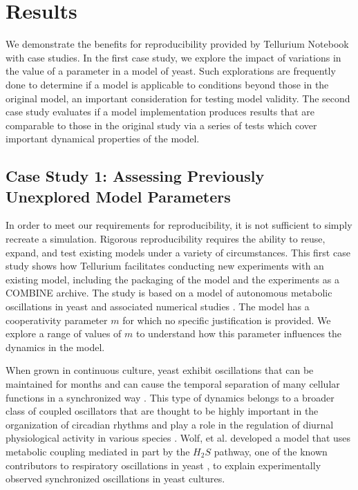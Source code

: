 \documentclass[10pt,letterpaper]{article}
\begin{document}

\section*{Results}

We demonstrate the benefits for reproducibility provided by Tellurium Notebook with case studies. In the first case study, we explore the impact of variations in the value of a parameter in a model of yeast. Such explorations are frequently done to determine if a model is applicable to conditions beyond those in the original model, an important consideration for testing model validity. The second case study evaluates if a model implementation produces results that are comparable to those in the original study via a series of tests which cover important dynamical properties of the model.

\subsection*{Case Study 1: Assessing Previously Unexplored Model Parameters}

In order to meet our requirements for reproducibility, it is not sufficient to simply recreate a simulation. Rigorous reproducibility requires the ability to reuse, expand, and test existing models under a variety of circumstances. This first case study shows how Tellurium facilitates conducting new experiments with an existing model, including the packaging of the model and the experiments as a COMBINE archive. The study is based on a model of autonomous metabolic oscillations in yeast and associated numerical studies \cite{wolf2001mathematical}. The model has a cooperativity parameter $m$ for which no specific justification is provided. We explore a range of values of $m$ to understand how this parameter influences the dynamics in the model.

When grown in continuous culture, yeast exhibit oscillations that can be maintained for months and can cause the temporal separation of many cellular functions in a synchronized way \cite{murray2007regulation}. This type of dynamics belongs to a broader class of coupled oscillators that are thought to be highly important in the organization of circadian rhythms and play a role in the regulation of diurnal physiological activity in various species \cite{winfree1967biological,dodd2005plant}.
Wolf, et al. \cite{wolf2001mathematical} developed a model that uses metabolic coupling mediated in part by the $H_2 S$ pathway, one of the known contributors to respiratory oscillations in yeast \cite{murray2007regulation}, to explain experimentally observed synchronized oscillations in yeast cultures.
\end{document}
